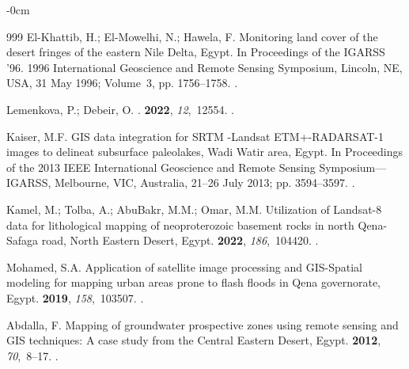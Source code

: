 \documentclass[information,article,accept,pdftex,moreauthors]{Definitions/mdpi}
\begin{document}
\begin{adjustwidth}{-\extralength}{0cm}
\begin{thebibliography}{999}
El-Khattib, H.; El-Mowelhi, N.; Hawela, F.
\newblock Monitoring land cover of the desert fringes of the eastern Nile
  Delta, Egypt.
\newblock In Proceedings of the IGARSS '96. 1996 International Geoscience and
  Remote Sensing Symposium, Lincoln, NE, USA, 31 May 1996; Volume~3, pp. 1756--1758. %
.

Lemenkova, P.; Debeir, O.
.
 {\bf 2022}, {\em 12},~12554.
.

Kaiser, M.F.
\newblock GIS data integration for SRTM -Landsat ETM+-RADARSAT-1 images to
  delineat subsurface paleolakes, Wadi Watir area, Egypt.
\newblock In Proceedings of the 2013 IEEE International Geoscience and Remote
  Sensing Symposium---IGARSS, Melbourne, VIC, Australia, 21--26 July 2013; pp. 3594--3597. %
.

Kamel, M.; Tolba, A.; AbuBakr, M.M.; Omar, M.M.
\newblock Utilization of Landsat-8 data for lithological mapping of
  neoproterozoic basement rocks in north Qena-Safaga road, North Eastern
  Desert, Egypt.
 {\bf 2022}, {\em
  186},~104420.
.

Mohamed, S.A.
\newblock Application of satellite image processing and GIS-Spatial modeling
  for mapping urban areas prone to flash floods in Qena governorate, Egypt.
 {\bf 2019}, {\em
  158},~103507.
.

Abdalla, F.
\newblock Mapping of groundwater prospective zones using remote sensing and GIS
  techniques: A case study from the Central Eastern Desert, Egypt.
 {\bf 2012}, {\em 70},~8--17.
.


\end{thebibliography}
\end{adjustwidth}
\end{document}
